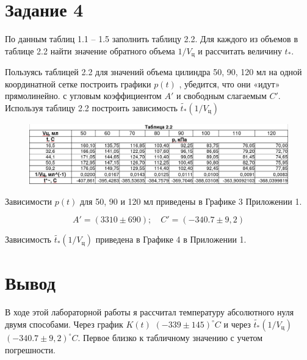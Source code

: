 \documentclass[11pt,a4paper]{article}
\begin{document}
\section{Задание 4}
По данным таблиц 1.1 -- 1.5 заполнить таблицу 2.2. Для каждого из объемов в таблице 2.2 найти значение обратного объема $1/V_ц$ и
рассчитать величину $t_*$.

Пользуясь таблицей 2.2 для значений объема цилиндра 50, 90, 120 мл на одной
координатной сетке построить графики $p(t)$ , убедится, что они «идут» прямолинейно.
с угловым коэффициентом $A'$ и свободным слагаемым $C'$.
Используя таблицу 2.2 построить зависимость $\widetilde{t_*}(1/V_ц)$
\begin{figure}[H]
	\includegraphics[scale=0.38]{../t.png}
\end{figure}
Зависимости $p(t)$ для 50, 90 и 120 мл приведены в Графике 3 Приложении 1.

\begin{equation}
A' = (3310 \pm 690); \quad C' = (-340.7 \pm 9,2)
\end{equation}

Зависимость $\widetilde{t_*}(1/V_ц)$ приведена в Графике 4 в Приложении 1.
\section{Вывод}
В ходе этой лабораторной работы я рассчитал температуру абсолютного нуля двумя способами. Через график $K(t)$ $(-339 \pm 145)^\circ C$ и через $\widetilde{t_*}(1/V_ц)$  $(-340.7 \pm 9,2)^\circ C$. Первое близко к табличному значению с учетом погрешности.
\end{document}
